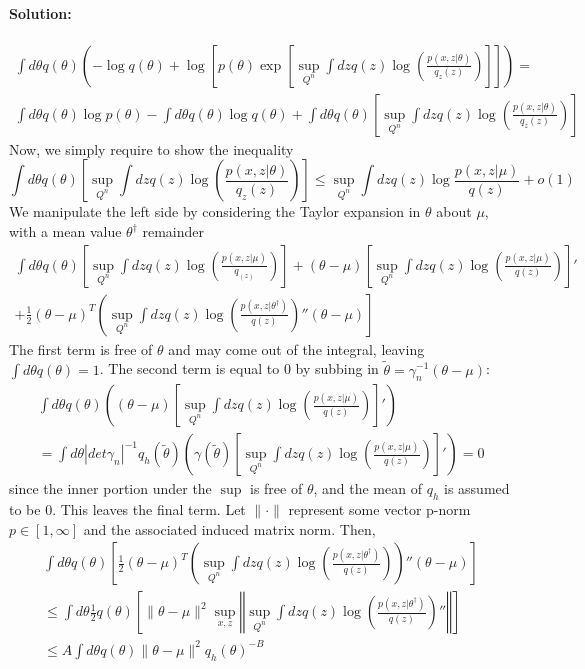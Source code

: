\paragraph{Solution:}
\begin{gather*}
\int d\theta q(\theta) \left(- \log q(\theta) + \log \left[ p(\theta) \exp \left[ \sup_{Q^n} \int dz q(z) \log\left( \frac{p(x,z|\theta)}{q_z(z)} \right)\right] \right] \right) = \\
\int d\theta q(\theta) \log p(\theta) - \int d\theta q(\theta)\log q(\theta) + \int d\theta q(\theta) \left[ \sup_{Q^n} \int dz q(z) \log\left( \frac{p(x,z|\theta)}{q_z(z)} \right)\right] 
\end{gather*}
Now, we simply require to show the inequality
$$ 
\int d\theta q(\theta) \left[ \sup_{Q^n} \int dz q(z) \log\left( \frac{p(x,z|\theta)}{q_z(z)} \right)\right]  \leq \sup_{Q^n} \int dz q(z) \log \frac{p(x,z|\mu)}{q(z)} +o(1)
$$
%
We manipulate the left side by considering the Taylor expansion in $\theta$ about $\mu$, with a mean value $\theta^{\dagger}$ remainder
\begin{gather*}
\int d\theta q(\theta) \left[ \sup_{Q^n} \int dz q(z) \log\left( \frac{p(x,z|\mu)}{q_(z)} \right)\right] + (\theta - \mu)\left[\sup_{Q^n} \int dz q(z)\log\left( \frac{p(x,z|\mu)}{q(z)} \right) \right]' \\
+ \frac{1}{2}(\theta - \mu)^T\left(\sup_{Q^n} \int dz q(z)\log \left( \frac{p(x,z|\theta^{\dagger})}{q(z)} \right)''(\theta - \mu) \right]
\end{gather*}
The first term is free of $\theta$ and may come out of the integral, leaving $\int d\theta q(\theta) = 1$. The second term is equal to 0 by subbing in $\tilde{\theta} = \gamma_n^{-1}(\theta - \mu)$: 
\begin{gather*}
\int d\theta q(\theta) \left((\theta - \mu)\left[\sup_{Q^n} \int dz q(z)\log\left( \frac{p(x,z|\mu)}{q(z)} \right) \right]' \right) \\
= \int d\theta |det \gamma_n|^{-1} q_h(\tilde{\theta}) \left( \gamma(\tilde{\theta}) \left[\sup_{Q^n} \int dz q(z)\log\left( \frac{p(x,z|\mu)}{q(z)} \right) \right]' \right) = 0
\end{gather*}
since the inner portion under the $\sup$ is free of $\theta$, and the mean of $q_h$ is assumed to be 0. This leaves the final term. Let $\|\cdot\|$ represent some vector p-norm $p \in [1, \infty]$ and the associated induced matrix norm. Then,
\begin{gather*}
\int d\theta q(\theta) \left[ \frac{1}{2}(\theta - \mu)^T\left(\sup_{Q^n} \int dz q(z)\log \left( \frac{p(x,z|\theta^{\dagger})}{q(z)} \right)\right)''(\theta - \mu) \right] \\
\leq \int d\theta \frac{1}{2}q(\theta) \left[ \|\theta-\mu\|^2  \sup_{x,z} \left\Vert \sup_{Q^n} \int dz q(z)\log \left( \frac{p(x,z|\theta^{\dagger})}{q(z)} \right)''\right\Vert \right] \\
\leq A \int d\theta q(\theta) \|\theta - \mu\|^2 q_h(\theta)^{-B}
\end{gather*}
